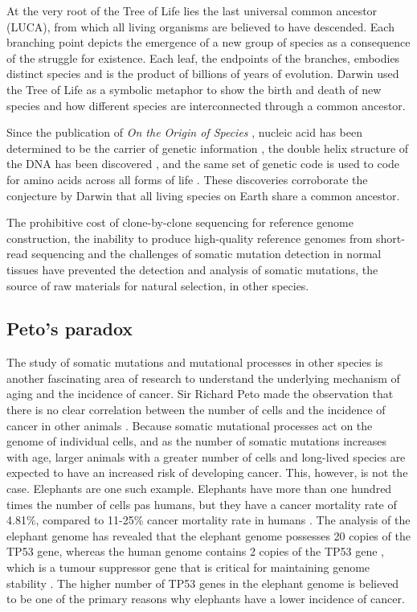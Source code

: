 At the very root of the Tree of Life lies the last universal common ancestor (LUCA), from which all living organisms are believed to have descended. Each branching point depicts the emergence of a new group of species as a consequence of the struggle for existence. Each leaf, the endpoints of the branches, embodies distinct species and is the product of billions of years of evolution. Darwin used the Tree of Life as a symbolic metaphor to show the birth and death of new species and how different species are interconnected through a common ancestor.

Since the publication of \textit{On the Origin of Species} \cite{Darwin1859}, nucleic acid has been determined to be the carrier of genetic information \cite{Avery1944-lr}, the double helix structure of the DNA has been discovered \cite{Watson1953-lr}, and the same set of genetic code is used to code for amino acids across all forms of life \cite{Woese1968-lr}. These discoveries corroborate the conjecture by Darwin that all living species on Earth share a common ancestor. 

The prohibitive cost of clone-by-clone sequencing for reference genome construction, the inability to produce high-quality reference genomes from short-read sequencing and the challenges of somatic mutation detection in normal tissues have prevented the detection and analysis of somatic mutations, the source of raw materials for natural selection, in other species.

\subsection{Peto’s paradox}

The study of somatic mutations and mutational processes in other species is another fascinating area of research to understand the underlying mechanism of aging and the incidence of cancer. Sir Richard Peto made the observation that there is no clear correlation between the number of cells and the incidence of cancer in other animals \cite{Peto2016-wf, Vincze2022-tw}. Because somatic mutational processes act on the genome of individual cells, and as the number of somatic mutations increases with age, larger animals with a greater number of cells and long-lived species are expected to have an increased risk of developing cancer. This, however, is not the case. Elephants are one such example. Elephants have more than one hundred times the number of cells pas humans, but they have a cancer mortality rate of 4.81\%, compared to 11-25\% cancer mortality rate in humans \cite{Abegglen2015-ao}. The analysis of the elephant genome has revealed that the elephant genome possesses 20 copies of the TP53 gene, whereas the human genome contains 2 copies of the TP53 gene \cite{Sulak2016-ld}, which is a tumour suppressor gene that is critical for maintaining genome stability \cite{Vousden2009-wd}. The higher number of TP53 genes in the elephant genome is believed to be one of the primary reasons why elephants have a lower incidence of cancer.


